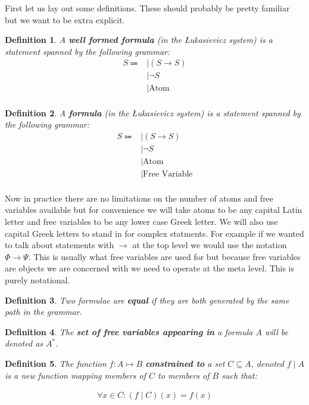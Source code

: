 \documentclass{article}
\newtheorem{defin}{Definition}
\begin{document}
First let us lay out some definitions.
These should probably be pretty familiar but we want to be extra explicit.

\begin{defin}
A \textbf{well formed formula} (in the \L ukasievicz system) is a statement spanned by the following grammar:
\begin{align*}
S \Coloneqq
& \mid (S \rightarrow S)  \\
& \mid \neg S  \\
& \mid \text{Atom} \\
\end{align*} 
\end{defin}

\begin{defin}
A \textbf{formula} (in the \L ukasievicz system) is a statement spanned by the following grammar:
\begin{align*}
S \Coloneqq
& \mid (S \rightarrow S)  \\
& \mid \neg S  \\
& \mid \text{Atom} \\
& \mid \text{Free Variable} \\
\end{align*} 
\end{defin}

Now in practice there are no limitations on the number of atoms and free variables available but for convenience we will take atoms to be any capital Latin letter and free variables to be any lower case Greek letter.
We will also use capital Greek letters to stand in for complex statments.
For example if we wanted to talk about statements with $\rightarrow$ at the top level we would use the notation $\Phi \rightarrow \Psi$.
This is usually what free variables are used for but because free variables are objects we are concerned with we need to operate at the meta level.
This is purely notational.

\begin{defin}
Two formulae are \textbf{equal} if they are both generated by the same path in the grammar.
\end{defin}

\begin{defin}
The \textbf{set of free variables appearing in} a formula $A$ will be denoted as $A^\ast$.
\end{defin}

\begin{defin}
The function $f : A \mapsto B$ \textbf{constrained to} a set $C \subseteq A$, denoted $f \mid A$ is a new function mapping
members of $C$ to members of $B$ such that:

\begin{align*}
\forall x \in C : (f \mid C) (x) = f (x)
\end{align*}
\end{defin}
\end{document}
